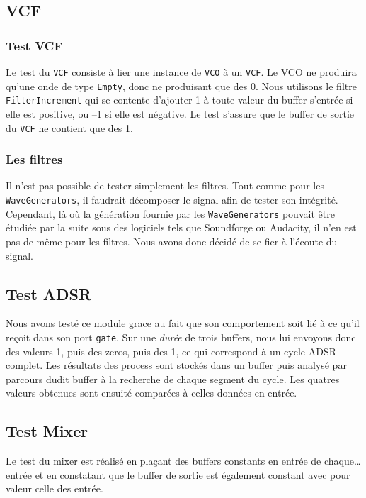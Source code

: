 \subsection{VCF}

\subsubsection{Test VCF}

Le test du \verb!VCF! consiste à lier une instance de \verb!VCO! à
un \verb!VCF!. Le VCO ne produira qu'une onde de type \verb!Empty!,
donc ne produisant que des 0. Nous utilisons le filtre
\verb!FilterIncrement! qui se contente d'ajouter 1 à toute valeur
du buffer s'entrée si elle est positive, ou --1 si elle est
négative. Le test s'assure que le buffer de sortie du \verb!VCF! ne
contient que des 1.

\subsubsection{Les filtres}

Il n'est pas possible de tester simplement les filtres. Tout comme
pour les \verb!WaveGenerators!, il faudrait décomposer le signal
afin de tester son intégrité. Cependant, là où la génération
fournie par les \verb!WaveGenerators! pouvait être étudiée par la
suite sous des logiciels tels que Soundforge ou Audacity, il n'en
est pas de même pour les filtres. Nous avons donc décidé de se fier
à l'écoute du signal.

\subsection{Test ADSR}

Nous avons testé ce module grace au fait que son comportement soit lié à ce qu'il reçoit dans son port \texttt{gate}. Sur une \textit{durée} de trois buffers, nous lui envoyons donc des valeurs 1, puis des zeros, puis des 1, ce qui correspond à un cycle ADSR complet. Les résultats des \og{}process\fg{} sont stockés dans un buffer puis analysé par parcours dudit buffer à la recherche de chaque segment du cycle. Les quatres valeurs obtenues sont ensuité comparées à celles données en entrée.


\subsection{Test Mixer}

Le test du mixer est réalisé en plaçant des buffers constants en entrée de chaque\dots entrée et en constatant que le buffer de sortie est également constant avec pour valeur celle des entrée.


